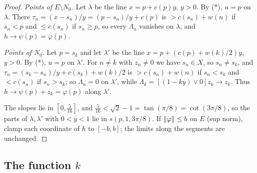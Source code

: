 \begin{proof}
\emph{Points of $E\setminus N_0$.} Let $\lambda$ be the line $x=p+c(p)y$, $y>0$. By (*), $u=p$ on $\lambda$. There
$\tau_n=(x-s_n)/y=(p-s_n)/y+c(p)$ is $>c(s_n)+w(n)$ if $s_n<p$ and $\le c(s_n)$ if $s_n\ge p$, so every $\Lambda_n$
vanishes on $\lambda$, and $h\to\psi(p)=\varphi(p)$.

\emph{Points of $N_0$.} Let $p=s_k$ and let $\lambda'$ be the line $x=p+(c(p)+w(k)/2)y$, $y>0$. By (*), $u=p$ on
$\lambda'$. For $n\ne k$ with $z_n\ne0$ we have $s_n\in X$, so $s_n\ne s_k$, and $\tau_n=(s_k-s_n)/y+c(s_k)+w(k)/2$ is
$>c(s_n)+w(n)$ if $s_n<s_k$ and $<c(s_n)$ if $s_n>s_k$; so $\Lambda_n=0$ on $\lambda'$, while $\Lambda_k=[(1-ky)\vee0]z_k\to z_k$.
Thus $h\to\psi(p)+z_k=\varphi(p)$ along $\lambda'$.

The slopes lie in $[0,\frac5{16}]$, and $\frac5{16}<\sqrt2-1=\tan(\pi/8)=\cot(3\pi/8)$, so the parts of $\lambda,\lambda'$
with $0<y<1$ lie in $s(p,1,3\pi/8)$. If $\lVert \varphi\rVert\le b$ on $E$ (sup norm), clamp each coordinate of $h$ to $[-b,b]$;
the limits along the segments are unchanged.
\end{proof}

\subsection{The function $k$}

